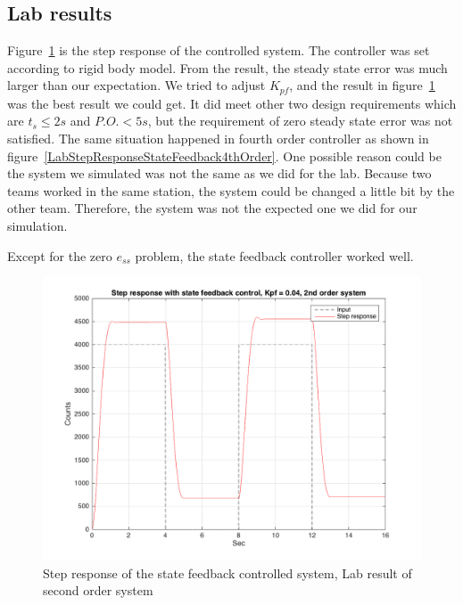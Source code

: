 \documentclass[a4paper, 12pt]{article}
\begin{document}
\subsection{Lab results}
\hspace{2.5ex} Figure~\ref{LabStepResponseStateFeedback} is the step response of the controlled system. The controller was set according to rigid body model. From the result, the steady state error was much larger than our expectation. We tried to adjust $K_{pf}$, and the result in figure~\ref{LabStepResponseStateFeedback} was the best result we could get. It did meet other two design requirements which are $t_s \le 2s$ and $P.O. < 5s$, but the requirement of zero steady state error was not satisfied. The same situation happened in fourth order controller as shown in figure~\ref{LabStepResponseStateFeedback4thOrder}. One possible reason could be the system we simulated was not the same as we did for the lab. Because two teams worked in the same station, the system could be changed a little bit by the other team. Therefore, the system was not the expected one we did for our simulation. 

Except for the zero $e_{ss}$ problem, the state feedback controller worked well. 

\begin{figure}[!htbp]
\centering
\includegraphics[scale = 0.3]{LabStepResponseStateFeedback}
\caption{Step response of the state feedback controlled system, Lab result of second order system}
\label{LabStepResponseStateFeedback}
\end{figure}
\end{document}
